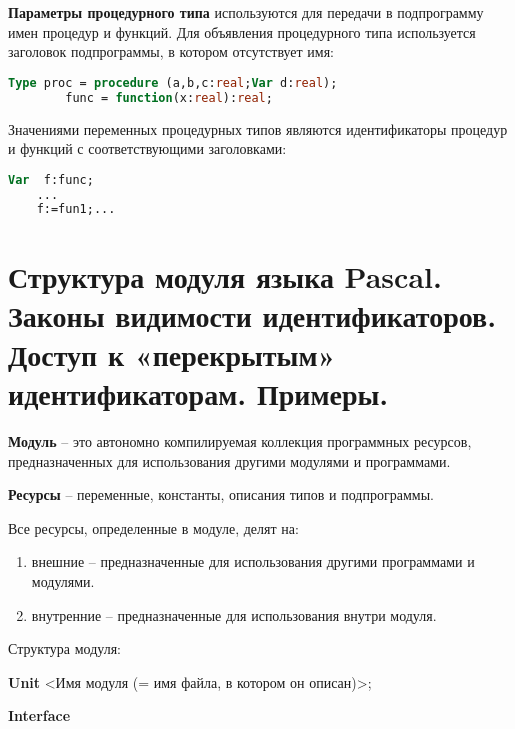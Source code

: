 {\bf{Параметры процедурного типа}} используются для передачи в подпрограмму имен процедур и функций. Для объявления процедурного типа используется заголовок подпрограммы, в котором отсутствует имя:

\begin{lstlisting}[language = pascal]
	Type proc = procedure (a,b,c:real;Var d:real);
        func = function(x:real):real;
\end{lstlisting}

Значениями переменных процедурных типов являются идентификаторы процедур и функций с соответствующими заголовками:

\begin{lstlisting}[language = pascal]
	Var  f:func;
	...
	f:=fun1;...
\end{lstlisting}




\newpage\section{Структура модуля языка Pascal. Законы видимости идентификаторов. Доступ к «перекрытым» идентификаторам. Примеры. }


\begin{myquote}
            
\end{myquote}

{\bf Модуль} – это автономно компилируемая коллекция программных ресурсов, предназначенных для использования другими модулями и программами.

{\bf Ресурсы} – переменные, константы, описания типов и подпрограммы.

Все ресурсы, определенные в модуле, делят на:

\begin{enumerate}
\item внешние – предназначенные для использования другими программами и модулями.
\item внутренние – предназначенные для использования внутри модуля.
\end{enumerate}

Структура модуля:

{\bf Unit} <Имя модуля (= имя файла, в котором он описан)>;

{\bf Interface }

